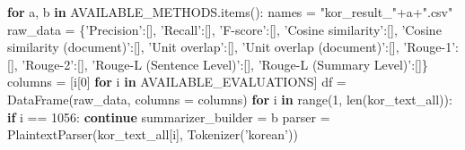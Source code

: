 \documentclass[11pt]{article}
\newenvironment{Shaded}{}{}
\newcommand{\KeywordTok}[1]{\textcolor[rgb]{0.00,0.44,0.13}{\textbf{{#1}}}}
\newcommand{\DecValTok}[1]{\textcolor[rgb]{0.25,0.63,0.44}{{#1}}}
\newcommand{\StringTok}[1]{\textcolor[rgb]{0.25,0.44,0.63}{{#1}}}
\newcommand{\NormalTok}[1]{{#1}}
\newcommand{\ControlFlowTok}[1]{\textcolor[rgb]{0.00,0.44,0.13}{\textbf{{#1}}}}
\newcommand{\OperatorTok}[1]{\textcolor[rgb]{0.40,0.40,0.40}{{#1}}}
\newcommand{\BuiltInTok}[1]{{#1}}
\begin{document}
    \begin{Shaded}
\begin{Highlighting}[]
\ControlFlowTok{for}\NormalTok{ a, b }\KeywordTok{in}\NormalTok{ AVAILABLE_METHODS.items():}
\NormalTok{    names }\OperatorTok{=} \StringTok{"kor_result_"}\OperatorTok{+}\NormalTok{a}\OperatorTok{+}\StringTok{".csv"}
\NormalTok{    raw_data }\OperatorTok{=}\NormalTok{ \{}\StringTok{'Precision'}\NormalTok{:[], }\StringTok{'Recall'}\NormalTok{:[], }\StringTok{'F-score'}\NormalTok{:[], }\StringTok{'Cosine similarity'}\NormalTok{:[], }\StringTok{'Cosine similarity (document)'}\NormalTok{:[], }\StringTok{'Unit overlap'}\NormalTok{:[], }\StringTok{'Unit overlap (document)'}\NormalTok{:[], }\StringTok{'Rouge-1'}\NormalTok{:[], }\StringTok{'Rouge-2'}\NormalTok{:[], }\StringTok{'Rouge-L (Sentence Level)'}\NormalTok{:[], }\StringTok{'Rouge-L (Summary Level)'}\NormalTok{:[]\}}
\NormalTok{    columns }\OperatorTok{=}\NormalTok{ [i[}\DecValTok{0}\NormalTok{] }\ControlFlowTok{for}\NormalTok{ i }\KeywordTok{in}\NormalTok{ AVAILABLE_EVALUATIONS]}
\NormalTok{    df }\OperatorTok{=}\NormalTok{ DataFrame(raw_data, columns }\OperatorTok{=}\NormalTok{ columns)}
    \ControlFlowTok{for}\NormalTok{ i }\KeywordTok{in} \BuiltInTok{range}\NormalTok{(}\DecValTok{1}\NormalTok{, }\BuiltInTok{len}\NormalTok{(kor_text_all)):}
        \ControlFlowTok{if}\NormalTok{ i }\OperatorTok{==} \DecValTok{1056}\NormalTok{: }\ControlFlowTok{continue}
\NormalTok{        summarizer_builder }\OperatorTok{=}\NormalTok{ b}
\NormalTok{        parser }\OperatorTok{=}\NormalTok{ PlaintextParser(kor_text_all[i], Tokenizer(}\StringTok{'korean'}\NormalTok{))}


\end{Highlighting}
\end{Shaded}
\end{document}
